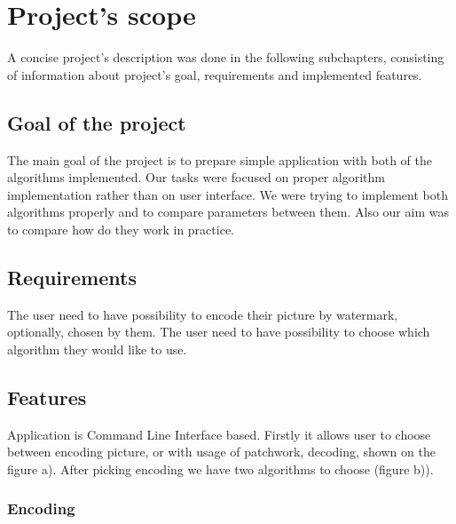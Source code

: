 \documentclass[a4paper, 12pt]{article}
\begin{document}
\section{Project's scope}

A concise project's description was done in the following subchapters, consisting of information about project's goal, requirements and implemented features.

\subsection{Goal of the project}
The main goal of the project is to prepare simple application with both of the algorithms implemented. Our tasks were focused on proper algorithm implementation rather than on user interface. We were trying to implement both algorithms properly and to compare parameters between them. Also our aim was to compare how do they work in practice.

\subsection{Requirements}

The user need to have possibility to encode their picture by watermark, optionally, chosen by them. The user need to have possibility to choose which algorithm they would like to use.

\subsection{Features}

Application is Command Line Interface based. Firstly it allows user to choose between encoding picture, or with usage of patchwork, decoding, shown on the figure a). After picking encoding we have two algorithms to choose (figure b)).

\begin{figure}[!h]%
	\centering
	\qquad
	\label{}%
\end{figure}

\subsubsection{Encoding}
\end{document}

